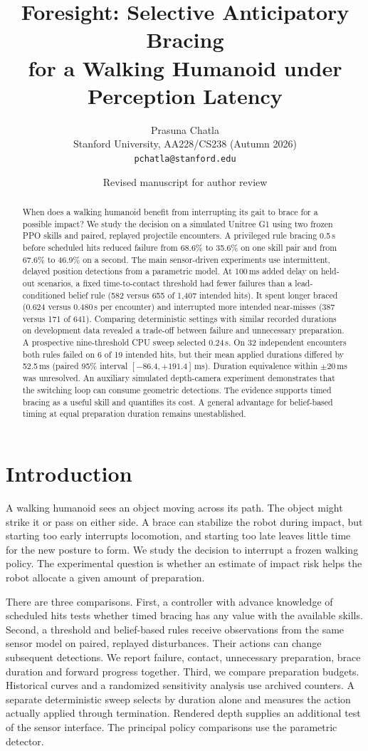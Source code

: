 \documentclass[10pt,twocolumn]{article}
\title{Foresight: Selective Anticipatory Bracing\\for a Walking Humanoid under Perception Latency}
\author{Prasuna Chatla\\ Stanford University, AA228/CS238 (Autumn 2026) \\ \texttt{pchatla@stanford.edu}}
\date{Revised manuscript for author review}
\begin{document}
\maketitle

\begin{abstract}
When does a walking humanoid benefit from interrupting its gait to brace for a possible impact? We study the decision on a simulated Unitree G1 using two frozen PPO skills and paired, replayed projectile encounters. A privileged rule bracing 0.5\,s before scheduled hits reduced failure from 68.6\% to 35.6\% on one skill pair and from 67.6\% to 46.9\% on a second. The main sensor-driven experiments use intermittent, delayed position detections from a parametric model. At 100\,ms added delay on held-out scenarios, a fixed time-to-contact threshold had fewer failures than a lead-conditioned belief rule (582 versus 655 of 1,407 intended hits). It spent longer braced (0.624 versus 0.480\,s per encounter) and interrupted more intended near-misses (387 versus 171 of 641). Comparing deterministic settings with similar recorded durations on development data revealed a trade-off between failure and unnecessary preparation. A prospective nine-threshold CPU sweep selected 0.24\,s. On 32 independent encounters both rules failed on 6 of 19 intended hits, but their mean applied durations differed by 52.5\,ms (paired 95\% interval $[-86.4,+191.4]$\,ms). Duration equivalence within $\pm20$\,ms was unresolved. An auxiliary simulated depth-camera experiment demonstrates that the switching loop can consume geometric detections. The evidence supports timed bracing as a useful skill and quantifies its cost. A general advantage for belief-based timing at equal preparation duration remains unestablished.
\end{abstract}

\section{Introduction}
A walking humanoid sees an object moving across its path. The object might strike it or pass on either side. A brace can stabilize the robot during impact, but starting too early interrupts locomotion, and starting too late leaves little time for the new posture to form. We study the decision to interrupt a frozen walking policy. The experimental question is whether an estimate of impact risk helps the robot allocate a given amount of preparation.

There are three comparisons. First, a controller with advance knowledge of scheduled hits tests whether timed bracing has any value with the available skills. Second, a threshold and belief-based rules receive observations from the same sensor model on paired, replayed disturbances. Their actions can change subsequent detections. We report failure, contact, unnecessary preparation, brace duration and forward progress together. Third, we compare preparation budgets. Historical curves and a randomized sensitivity analysis use archived counters. A separate deterministic sweep selects by duration alone and measures the action actually applied through termination. Rendered depth supplies an additional test of the sensor interface. The principal policy comparisons use the parametric detector.
\end{document}
